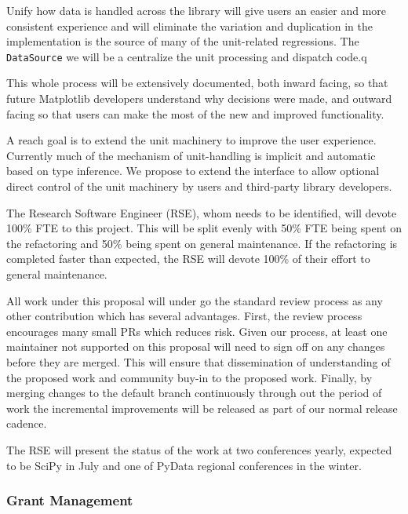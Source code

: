 \documentclass[12pt]{article}
\numberwithin{page}{section}
\begin{document}
Unify how data is handled across the library will give users an easier
and more consistent experience and will eliminate the variation and
duplication in the implementation is the source of many of the
unit-related regressions.  The \texttt{DataSource} we will be a
centralize the unit processing and dispatch code.q


This whole process will be extensively documented, both inward facing,
so that future Matplotlib developers understand why decisions were
made, and outward facing so that users can make the most of the new
and improved functionality.



A reach goal is to extend the unit machinery to improve the user
experience.  Currently much of the mechanism of unit-handling is
implicit and automatic based on type inference.  We propose to extend
the interface to allow optional direct control of the unit machinery
by users and third-party library developers.


The Research Software Engineer (RSE), whom needs to be identified,
will devote 100\% FTE to this project.  This will be split evenly with
50\% FTE being spent on the refactoring and 50\% being spent on
general maintenance.  If the refactoring is completed faster than
expected, the RSE will devote 100\% of their effort to general
maintenance.


All work under this proposal will under go the standard review process
as any other contribution which has several advantages.  First, the
review process encourages many small PRs which reduces risk.  Given
our process, at least one maintainer not supported on this proposal will
need to sign off on any changes before they are merged.  This will
ensure that dissemination of understanding of the proposed work and
community buy-in to the proposed work.  Finally, by merging changes to
the default branch continuously through out the period of work the
incremental improvements will be released as part of our normal
release cadence.

The RSE will present the status of the work at two conferences yearly,
expected to be SciPy in July and one of PyData regional conferences in
the winter.






\subsubsection{Grant Management}
\end{document}
